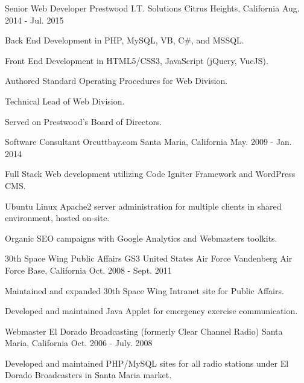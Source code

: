 \begin{cventries}
  \cventry
    {Senior Web Developer} %
    {Prestwood I.T. Solutions} %
    {Citrus Heights, California} %
    {Aug. 2014 - Jul. 2015} %
    {
      \begin{cvitems} %
        \item {Back End Development in PHP, MySQL, VB, C\#, and MSSQL.}
        \item {Front End Development in HTML5/CSS3, JavaScript (jQuery, VueJS). }
        \item {Authored Standard Operating Procedures for Web Division.}
        \item {Technical Lead of Web Division.}
        \item {Served on Prestwood's Board of Directors.}
      \end{cvitems}
    }

  \cventry
    {Software Consultant} %
    {Orcuttbay.com} %
    {Santa Maria, California} %
    {May. 2009 - Jan. 2014} %
    {
      \begin{cvitems} %
        \item {Full Stack Web development utilizing Code Igniter Framework and WordPress CMS.}
        \item {Ubuntu Linux Apache2 server administration for multiple clients in shared environment, hosted on-site. }
        \item {Organic SEO campaigns with Google Analytics and Webmasters toolkits.}
      \end{cvitems}
    }

  \cventry
    {30th Space Wing Public Affairs GS3} %
    {United States Air Force} %
    {Vandenberg Air Force Base, California} %
    {Oct. 2008 - Sept. 2011} %
    {
      \begin{cvitems} %
        \item {Maintained and expanded 30th Space Wing Intranet site for Public Affairs.}
        \item {Developed and maintained Java Applet for emergency exercise communication.}
      \end{cvitems}
    }

  \cventry
    {Webmaster} %
    {El Dorado Broadcasting (formerly Clear Channel Radio)} %
    {Santa Maria, California} %
    {Oct. 2006 - July. 2008} %
    {
      \begin{cvitems} %
        \item {Developed and maintained PHP/MySQL sites for all radio stations under El Dorado Broadcasters in Santa Maria market.}
      \end{cvitems}
    }



\end{cventries}
